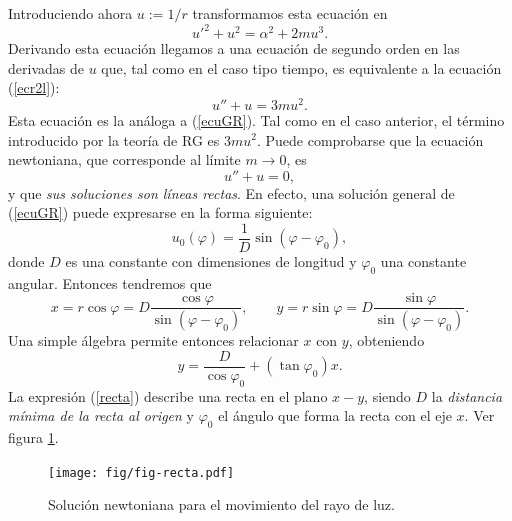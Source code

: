 Introduciendo ahora $u:=1/r$ transformamos esta ecuación en
\begin{equation}
 u'^2+u^2=\alpha^2+2mu^3. \label{ecul0}
\end{equation}
Derivando esta ecuación llegamos a una ecuación de segundo orden en las derivadas de $u$ que, tal como en el caso tipo tiempo, es equivalente a la ecuación (\ref{ecr2l}):
\begin{equation}
 u''+u=3mu^2. \label{ecglrg}
\end{equation}
Esta ecuación es la análoga a (\ref{ecuGR}). Tal como en el caso anterior, el término introducido por la teoría de RG es $3mu^2$. Puede comprobarse que la ecuación newtoniana, que corresponde al límite $m\to 0$, es
\begin{equation}
 u''+u=0, \label{ecglnew}
\end{equation}
y que \textit{sus soluciones son líneas rectas}. En efecto, una solución general de (\ref{ecuGR}) puede expresarse en la forma siguiente:
\begin{equation}
 u_0(\varphi)=\frac{1}{D}\sin(\varphi-\varphi_0),
\end{equation}
donde $D$ es una constante con dimensiones de longitud y $\varphi_0$ una constante angular. Entonces tendremos que
\begin{equation}
x=r\cos\varphi=D\frac{\cos\varphi}{\sin(\varphi-\varphi_0)}, \qquad
y=r\sin\varphi=D\frac{\sin\varphi}{\sin(\varphi-\varphi_0)}.
\end{equation}
Una simple álgebra permite entonces relacionar $x$ con $y$, obteniendo
\begin{equation}
 y=\frac{D}{\cos\varphi_0}+\left(\tan\varphi_0\right)x. \label{recta}
\end{equation}
La expresión (\ref{recta}) describe una recta en el plano $x-y$, siendo $D$ la \textit{distancia mínima de la recta al origen} y $\varphi_0$ el ángulo que forma la recta con el eje $x$. Ver figura \ref{fig:recta}.
\begin{figure}[H]
 \begin{center}
\texttt{[image: fig/fig-recta.pdf]}
\caption{Solución newtoniana para el movimiento del rayo de luz.}
\label{fig:recta}
\end{center}
\end{figure}

